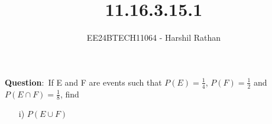 \documentclass[journal]{IEEEtran}
\begin{document}

\vspace{3cm}

\title{11.16.3.15.1}
\author{EE24BTECH11064 - Harshil Rathan }

{\let\newpage\relax\maketitle}

\renewcommand{\thefigure}{\theenumi}
\renewcommand{\thetable}{\theenumi}
\setlength{\intextsep}{10pt} %

\renewcommand{\thetable}{\theenumi}

\textbf{Question}:\
If E and F are events such that $P(E)=\frac{1}{4}$, $P(F)=\frac{1}{2}$ and $P(E \cap F)=\frac{1}{8}$, find 
\begin{itemize}
    \item [i)] $P(E \cup F)$
\end{itemize}
\end{document}
